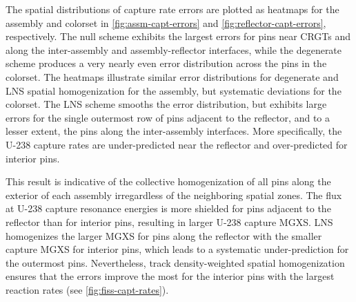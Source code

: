 The spatial distributions of capture rate errors are plotted as heatmaps for the assembly and colorset in \autoref{fig:assm-capt-errors} and \autoref{fig:reflector-capt-errors}, respectively. The null scheme exhibits the largest errors for pins near CRGTs and along the inter-assembly and assembly-reflector interfaces, while the degenerate scheme produces a very nearly even error distribution across the pins in the colorset. The heatmaps illustrate similar error distributions for degenerate and LNS spatial homogenization for the assembly, but systematic deviations for the colorset. The LNS scheme smooths the error distribution, but exhibits large errors for the single outermost row of pins adjacent to the reflector, and to a lesser extent, the pins along the inter-assembly interfaces. More specifically, the U-238 capture rates are under-predicted near the reflector and over-predicted for interior pins.

This result is indicative of the collective homogenization of all pins along the exterior of each assembly irregardless of the neighboring spatial zones. The flux at U-238 capture resonance energies is more shielded for pins adjacent to the reflector than for interior pins, resulting in larger U-238 capture MGXS. LNS homogenizes the larger MGXS for pins along the reflector with the smaller capture MGXS for interior pins, which leads to a systematic under-prediction for the outermost pins. Nevertheless, track density-weighted spatial homogenization ensures that the errors improve the most for the interior pins with the largest reaction rates (see \autoref{fig:fiss-capt-rates}).

\clearpage

